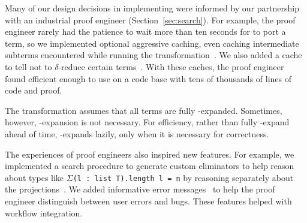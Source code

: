 Many of our design decisions in implementing \toolnamec were informed by our partnership with
an industrial proof engineer (Section~\ref{sec:search}).
For example, the proof engineer rarely had the patience to wait more than ten seconds
for \toolnamec to port a term,
so we implemented optional aggressive caching, even caching intermediate subterms
encountered while running the transformation~\href{https://github.com/uwplse/pumpkin-pi/blob/v2.0.0/plugin/src/cache/caching.ml}{}. %
We also added a cache to tell \toolnamec not to $\delta$-reduce certain terms~\href{https://github.com/uwplse/pumpkin-pi/blob/v2.0.0/plugin/src/cache/caching.ml}{}.
With these caches, the proof engineer found \toolnamec efficient enough to use on a code base with tens of thousands of lines of code and proof.


The transformation assumes that all terms are fully \smallmath{$\eta$}-expanded. Sometimes,
however, \smallmath{$\eta$}-expansion is not necessary.
For efficiency, rather than fully \smallmath{$\eta$}-expand ahead of time, \toolnamec \smallmath{$\eta$}-expands lazily, 
only when it is necessary for correctness.

The experiences of proof engineers also inspired new features.
For example, we implemented a search procedure to generate custom eliminators %
to help reason about types like $\Sigma$\lstinline{(l : list T).length l = n}
by reasoning separately about the projections~\href{https://github.com/uwplse/pumpkin-pi/blob/v2.0.0/plugin/src/automation/search/smartelim.ml}{}. %
We added informative error messages~\href{https://github.com/uwplse/pumpkin-pi/blob/v2.0.0/plugin/src/lib/ornerrors.ml}{} to help the proof engineer distinguish between user errors and bugs. %
These features helped with workflow integration. %




